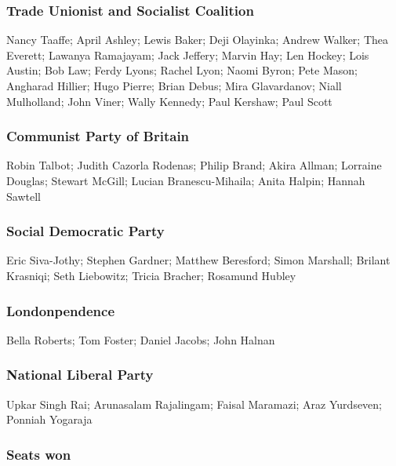 \begin{resultsiii}
	\subsubsection*{Trade Unionist and Socialist Coalition}
	Nancy Taaffe; April Ashley; Lewis Baker; Deji Olayinka; Andrew Walker; Thea Everett; Lawanya Ramajayam; Jack Jeffery; Marvin Hay; Len Hockey; Lois Austin; Bob Law; Ferdy Lyons; Rachel Lyon; Naomi Byron; Pete Mason; Angharad Hillier; Hugo Pierre; Brian Debus; Mira Glavardanov; Niall Mulholland; John Viner; Wally Kennedy; Paul Kershaw; Paul Scott
	
	\subsubsection*{Communist Party of Britain}
	Robin Talbot; Judith Cazorla Rodenas; Philip Brand; Akira Allman; Lorraine Douglas; Stewart McGill; Lucian Branescu-Mihaila; Anita Halpin; Hannah Sawtell
	
	\subsubsection*{Social Democratic Party}
	Eric Siva-Jothy; Stephen Gardner; Matthew Beresford; Simon Marshall; Brilant Krasniqi; Seth Liebowitz; Tricia Bracher; Rosamund Hubley

	\subsubsection*{Londonpendence}
	Bella Roberts; Tom Foster; Daniel Jacobs; John Halnan

	\subsubsection*{National Liberal Party}
	Upkar Singh Rai; Arunasalam Rajalingam; Faisal Maramazi; Araz Yurdseven; Ponniah Yogaraja


	
\end{resultsiii}

\subsubsection*{Seats won}

